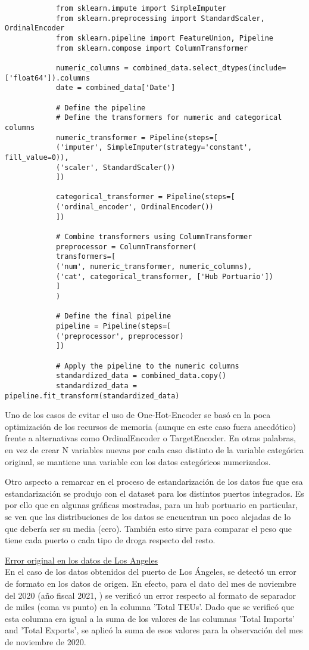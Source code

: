 \documentclass[12pt]{article}
\begin{document}
		\begin{verbatim}
			from sklearn.impute import SimpleImputer
			from sklearn.preprocessing import StandardScaler, OrdinalEncoder
			from sklearn.pipeline import FeatureUnion, Pipeline
			from sklearn.compose import ColumnTransformer
			
			numeric_columns = combined_data.select_dtypes(include=['float64']).columns
			date = combined_data['Date']
			
			# Define the pipeline
			# Define the transformers for numeric and categorical columns
			numeric_transformer = Pipeline(steps=[
			('imputer', SimpleImputer(strategy='constant', fill_value=0)),
			('scaler', StandardScaler())
			])
			
			categorical_transformer = Pipeline(steps=[
			('ordinal_encoder', OrdinalEncoder())
			])
			
			# Combine transformers using ColumnTransformer
			preprocessor = ColumnTransformer(
			transformers=[
			('num', numeric_transformer, numeric_columns),
			('cat', categorical_transformer, ['Hub Portuario'])
			]
			)
			
			# Define the final pipeline
			pipeline = Pipeline(steps=[
			('preprocessor', preprocessor)
			])
			
			# Apply the pipeline to the numeric columns
			standardized_data = combined_data.copy()
			standardized_data = pipeline.fit_transform(standardized_data)
		\end{verbatim}
	
		Uno de los casos de evitar el uso de One-Hot-Encoder se basó en la poca optimización de los recursos de memoria (aunque en este caso fuera anecdótico) frente a alternativas como OrdinalEncoder o TargetEncoder. En otras palabras, en vez de crear N variables nuevas por cada caso distinto de la variable categórica original, se mantiene una variable con los datos categóricos numerizados.
		
		Otro aspecto a remarcar en el proceso de estandarización de los datos fue que esa estandarización se produjo con el dataset para los distintos puertos integrados. Es por ello que en algunas gráficas mostradas, para un hub portuario en particular, se ven que las distribuciones de los datos se encuentran un poco alejadas de lo que debería ser su media (cero). También esto sirve para comparar el peso que tiene cada puerto o cada tipo de droga respecto del resto.
		
		\underline{Error original en los datos de Los Angeles}\\
		En el caso de los datos obtenidos del puerto de Los Ángeles, se detectó un error de formato en los datos de origen. En efecto, para el dato del mes de noviembre del 2020 (año fiscal 2021, \cite{portla2025containerstats}) se verificó un error respecto al formato de separador de miles (coma vs punto) en la columna 'Total TEUs'. Dado que se verificó que esta columna era igual a la suma de los valores de las columnas 'Total Imports' and 'Total Exports', se aplicó la suma de esos valores para la observación del mes de noviembre de 2020.
		
\end{document}
